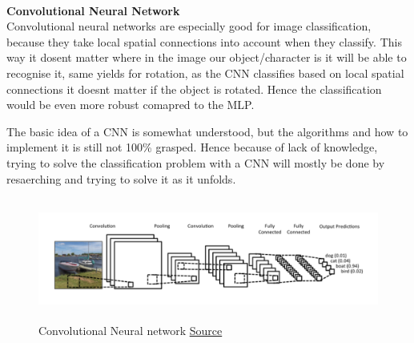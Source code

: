 \documentclass[11pt,a4paper,UKenglish]{article}
\begin{document}
\noindent \\ \textbf{Convolutional Neural Network}
\noindent \\ Convolutional neural networks are especially good for image
classification, because they take local spatial connections into account when
they classify. This way it dosent matter where in the image our
object/character is it will be able to recognise it, same yields for rotation,
as the CNN classifies based on local spatial connections it doesnt matter if
the object is rotated. Hence the classification would be even more robust
comapred to the MLP. \par
The basic idea of a CNN is somewhat understood, but the algorithms and how to
implement it is still not 100\% grasped. Hence because of lack of knowledge,
trying to solve the classification problem with a CNN will mostly be done
by resaerching and trying to solve it as it unfolds.

\begin{figure}[H]
  \centering
  \includegraphics[height=4cm]{res/CNN_architecture.png}
  \caption{Convolutional Neural network \href{ http://www.wildml.com/2015/11/understanding-convolutional-neural-networks-for-nlp/}{Source}}
  \label{fig:CNN_architecture}
\end{figure}
\end{document}
